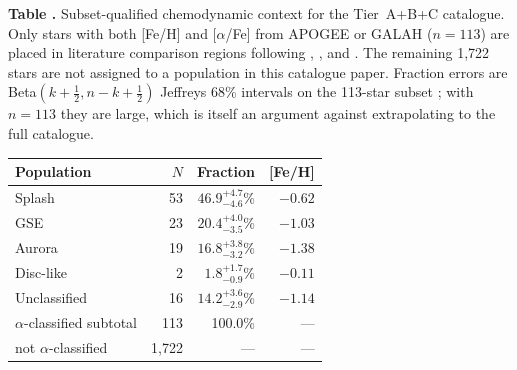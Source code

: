 \begin{center}
\label{tab:population_decomp}
\begin{minipage}{\columnwidth}
\small\textbf{Table \thetable.} Subset-qualified chemodynamic context for
the Tier~A+B+C catalogue. Only stars with both [Fe/H] and [$\alpha$/Fe]
from APOGEE or GALAH ($n=113$) are placed in literature comparison
regions following \citet{Belokurov2020}, \citet{Helmi2018}, and
\citet{BelokurovKravtsov2022}. The remaining 1{,}722 stars are not
assigned to a population in this catalogue paper.  Fraction errors are
Beta$(k+\tfrac{1}{2}, n-k+\tfrac{1}{2})$ Jeffreys 68\% intervals on the
113-star subset \citep{Cameron2011}; with $n=113$ they are large,
which is itself an argument against extrapolating to the full
catalogue.
\end{minipage}
\vspace{0.4ex}

\small
\setlength{\tabcolsep}{0pt}
\begin{tabular*}{\columnwidth}{@{\extracolsep{\fill}}lrrr@{}}
\hline\hline
Population & $N$ & Fraction & [Fe/H] \\
\hline
Splash                              & 53      & $46.9^{+4.7}_{-4.6}\%$ & $-0.62$ \\
GSE                                 & 23      & $20.4^{+4.0}_{-3.5}\%$ & $-1.03$ \\
Aurora                              & 19      & $16.8^{+3.8}_{-3.2}\%$ & $-1.38$ \\
Disc-like                           &  2      & $1.8^{+1.7}_{-0.9}\%$  & $-0.11$ \\
Unclassified                        & 16      & $14.2^{+3.6}_{-2.9}\%$ & $-1.14$ \\
\hline
$\alpha$-classified subtotal       & 113     & 100.0\%                &  ---    \\
not $\alpha$-classified             & 1{,}722 & ---                    & ---     \\
\hline
\end{tabular*}
\end{center}
